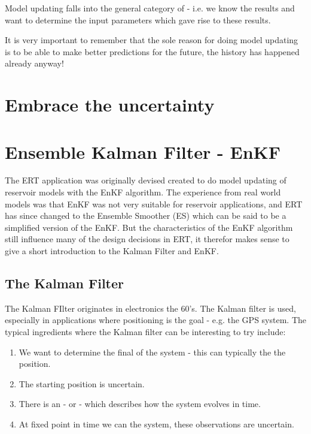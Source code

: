 \documentclass[a4paper,10pt,english]{sphinxmanual}
\begin{document}
Model updating falls into the general category of  - i.e. we
know the results and want to determine the input parameters which gave rise to
these results.

It is very important to remember that the sole reason for doing model updating
is to be able to make better predictions for the future, the history has
happened already anyway!


\section{Embrace the uncertainty}
\label{\detokenize{introduction/index:embrace-the-uncertainty}}

\section{Ensemble Kalman Filter - EnKF}
\label{\detokenize{introduction/index:ensemble-kalman-filter-enkf}}
The ERT application was originally devised created to do model updating of
reservoir models with the EnKF algorithm. The experience from real world models
was that EnKF was not very suitable for reservoir applications, and ERT has
since changed to the Ensemble Smoother (ES) which can be said to be a simplified
version of the EnKF. But the characteristics of the EnKF algorithm still
influence many of the design decisions in ERT, it therefor makes sense to give a
short introduction to the Kalman Filter and EnKF.


\subsection{The Kalman Filter}
\label{\detokenize{introduction/index:the-kalman-filter}}
The Kalman FIlter originates in electronics the 60’s. The Kalman filter is
 used, especially in applications where positioning is the goal - e.g.
the GPS system. The typical ingredients where the Kalman filter can be
interesting to try include:
\begin{enumerate}
\item {} 
We want to determine the final  of the system - this can typically the
the position.

\item {} 
The starting position is uncertain.

\item {} 
There is an  - or  - which describes how
the system evolves in time.

\item {} 
At fixed point in time we can  the system, these observations are
uncertain.

\end{enumerate}
\end{document}
